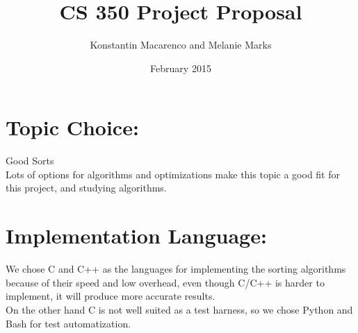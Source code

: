\documentclass{article}
\title{CS 350 Project Proposal}
\author{Konstantin Macarenco and Melanie Marks }
\date{February 2015}
\begin{document}
\maketitle


%


\noindent
\section*{Topic Choice:}

Good Sorts\\
Lots of options for algorithms and optimizations make this topic a good fit for this project, and studying algorithms.
\section*{Implementation Language:}

We chose C and C++ as the languages for implementing the sorting algorithms because of their speed and low overhead, even though C/C++ is harder to implement, it will produce more accurate results. \\
On the other hand C is not well suited as a test harness, so we chose Python and Bash for test automatization.\\

\end{document}
